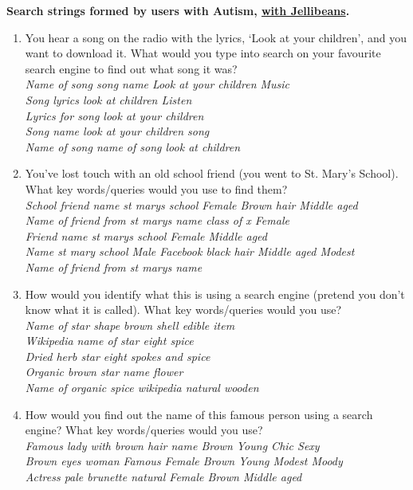 \documentclass[a4paper, 11pt]{article}
\begin{document}
\textbf{Search strings formed by users with Autism, \underline{with Jellibeans}. }
\begin{enumerate}\label{asdresponses}
\item{You hear a song on the radio with the lyrics, `Look at your children', and you want to download it. What would you type into search on your favourite search engine to find out what song it was?\\\textit{
Name of song song name Look at your children Music\\    
Song lyrics look at children Listen \\
Lyrics for song  look at your children \\      
Song name look at your children song \\      
Name of song name of song look at children 	
}}
\item{You've lost touch with an old school friend (you went to St. Mary's School). What key words/queries would you use to find them?\\\textit{
School friend name st marys school Female Brown hair Middle aged \\ 
Name of friend from st marys name class of x Female \\        
Friend name st marys school Female Middle aged  \\
Name st mary school Male Facebook black hair Middle aged Modest \\
Name of friend from st marys name 
}}
\item{How would you identify what this is using a search engine (pretend you don't know what it is called). What key words/queries would you use?\\\textit{
Name of star shape brown shell edible item \\        
Wikipedia name of star eight spice \\    
Dried herb star eight spokes and spice \\        
Organic brown star name flower \\       
Name of  organic spice wikipedia  natural wooden     
}}
\item{How would you find out the name of this famous person using a search engine? What key words/queries would you use?\\\textit{
Famous lady with brown hair name Brown Young Chic Sexy\\
Brown eyes woman Famous Female Brown Young Modest Moody\\
Actress pale brunette natural Female Brown Middle aged \\
}}
\end{enumerate}
\end{document}
